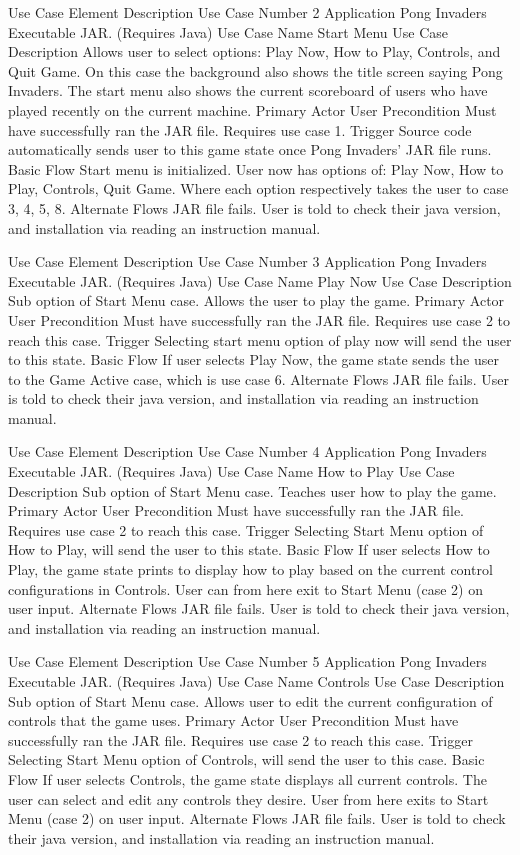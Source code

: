 \documentclass[12pt, titlepage]{article}
\begin{document}
Use Case Element
Description
Use Case Number
2
Application
Pong Invaders Executable JAR. (Requires Java)
Use Case Name
Start Menu
Use Case Description
Allows user to select options: Play Now, How to Play, Controls, and Quit Game. On this case the background also shows the title screen saying Pong Invaders. The start menu also shows the current scoreboard of users who have played recently on the current machine.
Primary Actor
User 
Precondition
Must have successfully ran the JAR file. Requires use case 1.
Trigger
Source code automatically sends user to this game state once Pong Invaders’ JAR file runs.
Basic Flow
Start menu is initialized. User now has options of: Play Now, How to Play, Controls, Quit Game. Where each option respectively takes the user to case 3, 4, 5, 8.
Alternate Flows
JAR file fails. User is told to check their java version, and installation via reading an instruction manual.


Use Case Element
Description
Use Case Number
3
Application
Pong Invaders Executable JAR. (Requires Java)
Use Case Name
Play Now
Use Case Description
Sub option of Start Menu case. Allows the user to play the game.
Primary Actor
User 
Precondition
Must have successfully ran the JAR file. Requires use case 2 to reach this case.
Trigger
Selecting start menu option of play now will send the user to this state.
Basic Flow
If user selects Play Now, the game state sends the user to the Game Active case, which is use case 6.
Alternate Flows
JAR file fails. User is told to check their java version, and installation via reading an instruction manual.


Use Case Element
Description
Use Case Number
4
Application
Pong Invaders Executable JAR. (Requires Java)
Use Case Name
How to Play
Use Case Description
Sub option of Start Menu case. Teaches user how to play the game.
Primary Actor
User 
Precondition
Must have successfully ran the JAR file. Requires use case 2 to reach this case.
Trigger
Selecting Start Menu option of How to Play, will send the user to this state.
Basic Flow
If user selects How to Play, the game state prints to display how to play based on the current control configurations in Controls. User can from here exit to Start Menu (case 2) on user input.
Alternate Flows
JAR file fails. User is told to check their java version, and installation via reading an instruction manual.


Use Case Element
Description
Use Case Number
5
Application
Pong Invaders Executable JAR. (Requires Java)
Use Case Name
Controls
Use Case Description
Sub option of Start Menu case. Allows user to edit the current configuration of controls that the game uses.
Primary Actor
User 
Precondition
Must have successfully ran the JAR file. Requires use case 2 to reach this case.
Trigger
Selecting Start Menu option of Controls, will send the user to this case.
Basic Flow
If user selects Controls, the game state displays all current controls. The user can select and edit any controls they desire. User from here exits to Start Menu (case 2) on user input.
Alternate Flows
JAR file fails. User is told to check their java version, and installation via reading an instruction manual.
\end{document}
